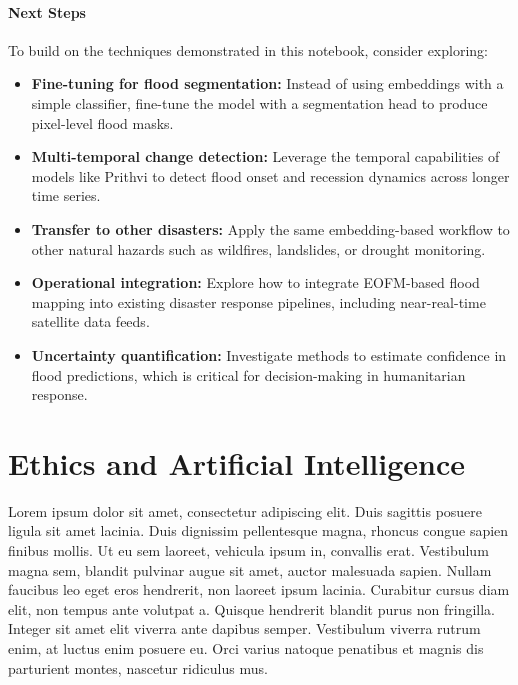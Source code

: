 \documentclass[
  letterpaper,
  DIV=11,
  numbers=noendperiod]{scrreprt}
\providecommand{\tightlist}{%
  \setlength{\itemsep}{0pt}\setlength{\parskip}{0pt}}\usepackage{longtable,booktabs,array}
\begin{document}
\subsubsection{Next Steps}\label{next-steps}

To build on the techniques demonstrated in this notebook, consider
exploring:

\begin{itemize}
\tightlist
\item
  \textbf{Fine-tuning for flood segmentation:} Instead of using
  embeddings with a simple classifier, fine-tune the model with a
  segmentation head to produce pixel-level flood masks.
\item
  \textbf{Multi-temporal change detection:} Leverage the temporal
  capabilities of models like Prithvi to detect flood onset and
  recession dynamics across longer time series.
\item
  \textbf{Transfer to other disasters:} Apply the same embedding-based
  workflow to other natural hazards such as wildfires, landslides, or
  drought monitoring.
\item
  \textbf{Operational integration:} Explore how to integrate EOFM-based
  flood mapping into existing disaster response pipelines, including
  near-real-time satellite data feeds.
\item
  \textbf{Uncertainty quantification:} Investigate methods to estimate
  confidence in flood predictions, which is critical for decision-making
  in humanitarian response.
\end{itemize}


\chapter{Ethics and Artificial
Intelligence}\label{ethics-and-artificial-intelligence}

Lorem ipsum dolor sit amet, consectetur adipiscing elit. Duis sagittis
posuere ligula sit amet lacinia. Duis dignissim pellentesque magna,
rhoncus congue sapien finibus mollis. Ut eu sem laoreet, vehicula ipsum
in, convallis erat. Vestibulum magna sem, blandit pulvinar augue sit
amet, auctor malesuada sapien. Nullam faucibus leo eget eros hendrerit,
non laoreet ipsum lacinia. Curabitur cursus diam elit, non tempus ante
volutpat a. Quisque hendrerit blandit purus non fringilla. Integer sit
amet elit viverra ante dapibus semper. Vestibulum viverra rutrum enim,
at luctus enim posuere eu. Orci varius natoque penatibus et magnis dis
parturient montes, nascetur ridiculus mus.
\end{document}
